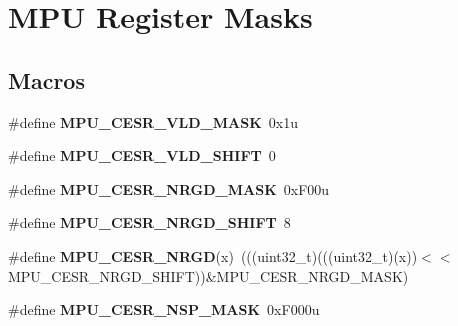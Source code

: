 \hypertarget{group__MPU__Register__Masks}{}\section{M\+PU Register Masks}
\label{group__MPU__Register__Masks}
\subsection*{Macros}
\begin{DoxyCompactItemize}
\item 
\#define {\bfseries M\+P\+U\+\_\+\+C\+E\+S\+R\+\_\+\+V\+L\+D\+\_\+\+M\+A\+SK}~0x1u\hypertarget{group__MPU__Register__Masks_ga97170048bb44b005879eac9ef8db2c14}{}\label{group__MPU__Register__Masks_ga97170048bb44b005879eac9ef8db2c14}

\item 
\#define {\bfseries M\+P\+U\+\_\+\+C\+E\+S\+R\+\_\+\+V\+L\+D\+\_\+\+S\+H\+I\+FT}~0\hypertarget{group__MPU__Register__Masks_ga78bad194c9de3bebb9eba101cf58c613}{}\label{group__MPU__Register__Masks_ga78bad194c9de3bebb9eba101cf58c613}

\item 
\#define {\bfseries M\+P\+U\+\_\+\+C\+E\+S\+R\+\_\+\+N\+R\+G\+D\+\_\+\+M\+A\+SK}~0x\+F00u\hypertarget{group__MPU__Register__Masks_gab2bc6f6060eddc0403a79f7f5e31f270}{}\label{group__MPU__Register__Masks_gab2bc6f6060eddc0403a79f7f5e31f270}

\item 
\#define {\bfseries M\+P\+U\+\_\+\+C\+E\+S\+R\+\_\+\+N\+R\+G\+D\+\_\+\+S\+H\+I\+FT}~8\hypertarget{group__MPU__Register__Masks_ga30493ea4dcacc6d2bf116459dd57362e}{}\label{group__MPU__Register__Masks_ga30493ea4dcacc6d2bf116459dd57362e}

\item 
\#define {\bfseries M\+P\+U\+\_\+\+C\+E\+S\+R\+\_\+\+N\+R\+GD}(x)~(((uint32\+\_\+t)(((uint32\+\_\+t)(x))$<$$<$M\+P\+U\+\_\+\+C\+E\+S\+R\+\_\+\+N\+R\+G\+D\+\_\+\+S\+H\+I\+FT))\&M\+P\+U\+\_\+\+C\+E\+S\+R\+\_\+\+N\+R\+G\+D\+\_\+\+M\+A\+SK)\hypertarget{group__MPU__Register__Masks_ga5e4ddcc102a418d506925d0da3bc09e6}{}\label{group__MPU__Register__Masks_ga5e4ddcc102a418d506925d0da3bc09e6}

\item 
\#define {\bfseries M\+P\+U\+\_\+\+C\+E\+S\+R\+\_\+\+N\+S\+P\+\_\+\+M\+A\+SK}~0x\+F000u\hypertarget{group__MPU__Register__Masks_gadfa15098e24cc47d3c919a4a50702050}{}\label{group__MPU__Register__Masks_gadfa15098e24cc47d3c919a4a50702050}


\end{DoxyCompactItemize}
